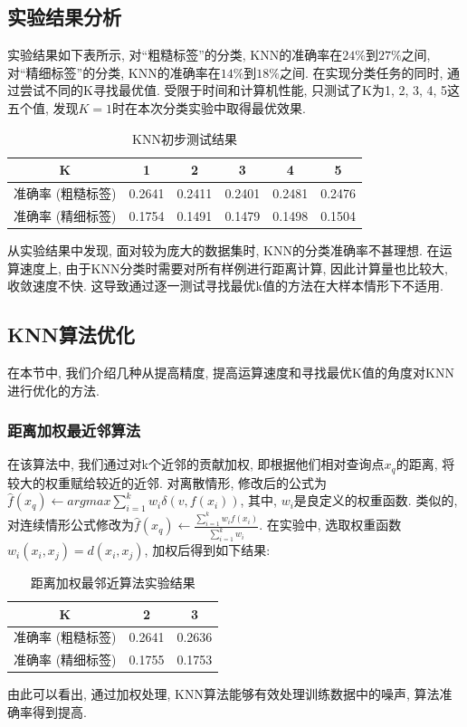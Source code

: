 \documentclass[lang=cn, 11pt,   a4paper]{elegantpaper}
\begin{document}
\subsection{实验结果分析}
实验结果如下表所示,  对“粗糙标签”的分类,  KNN的准确率在$24\%$到$27\%$之间,  对“精细标签”的分类,  KNN的准确率在$14\%$到$18\% $之间. 在实现分类任务的同时,  通过尝试不同的K寻找最优值. 受限于时间和计算机性能,  只测试了K为1,  2,  3,  4,  5这五个值,  发现$K=1$时在本次分类实验中取得最优效果. 
\begin{table}[htbp]
\centering
\begin{tabular}{|c|c|c|c|c|c|}%
	\hline  %
	K&1&2&3&4&5\\
	\hline  %
	{准确率 (粗糙标签)}&0.2641&0.2411&0.2401&0.2481&0.2476\\
	\hline %
	{准确率 (精细标签)}&0.1754&0.1491&0.1479&0.1498&0.1504\\
	\hline
\end{tabular}
\caption{KNN初步测试结果}
\end{table}
从实验结果中发现,  面对较为庞大的数据集时,  KNN的分类准确率不甚理想. 在运算速度上,  由于KNN分类时需要对所有样例进行距离计算,  因此计算量也比较大,  收敛速度不快. 这导致通过逐一测试寻找最优k值的方法在大样本情形下不适用. 

\subsection{KNN算法优化}
在本节中, 我们介绍几种从提高精度, 提高运算速度和寻找最优K值的角度对KNN进行优化的方法.
\subsubsection{距离加权最近邻算法\cite{Mitchell97}}
在该算法中,  我们通过对k个近邻的贡献加权,  即根据他们相对查询点$x_{q}$的距离,  将较大的权重赋给较近的近邻. 对离散情形,  修改后的公式为$ \hat f (x_{q}) \leftarrow argmax{\sum_{i=1}^{k} {w_{i}}\delta (v,  f (x_{i}))}$,  其中,  $w_{i}$是良定义的权重函数. 类似的,  对连续情形公式修改为${\hat f (x_{q}) \leftarrow \frac{\sum_{i=1}^{k}{w_{i}f (x_{i})}}{\sum_{i=1}^{k}{w_{i}}}}$. 在实验中,  选取权重函数$w_{i} (x_{i},  x_{j}) = d (x_{i},  x_{j})$,  加权后得到如下结果: 
\begin{table}[htbp]
\centering
\begin{tabular}{|c|c|c|}%
	\hline  %
	K&2&3\\
	\hline  %
	{准确率 (粗糙标签)}&0.2641&0.2636\\
	\hline %
	{准确率 (精细标签)}&0.1755&0.1753\\
	\hline
\end{tabular}
\caption{距离加权最邻近算法实验结果}
\end{table}
由此可以看出,  通过加权处理,  KNN算法能够有效处理训练数据中的噪声,  算法准确率得到提高. 
\end{document}
